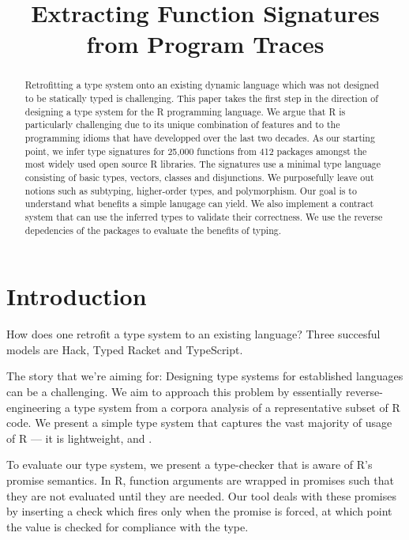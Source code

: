 \documentclass[acmsmall,review,anonymous]{acmart}\settopmatter{printfolios=true,printccs=false,printacmref=false}
\begin{document}
\title{Extracting Function Signatures from Program Traces}

\newcommand{\NUMFUNCTIONS}{25,000\xspace}  %
\newcommand{\NUMPACKAGES}{412\xspace}  %
\newcommand{\YEARS}{20\xspace} %


\begin{abstract}
  Retrofitting a type system onto an existing dynamic language which was not
  designed to be statically typed is challenging. This paper takes the first
  step in the direction of designing a type system for the R programming
  language. We argue that R is particularly challenging due to its unique
  combination of features and to the programming idioms that have developped
  over the last two decades. As our starting point, we infer type signatures
  for \NUMFUNCTIONS functions from \NUMPACKAGES packages amongst the most
  widely used open source R libraries. The signatures use a minimal type
  language consisting of basic types, vectors, classes and disjunctions. We
  purposefully leave out notions such as subtyping, higher-order types, and
  polymorphism. Our goal is to understand what benefits a simple lanugage
  can yield.  We also implement a contract system that can use the inferred
  types to validate their correctness. We use the reverse depedencies of the
  packages to evaluate the benefits of typing.
\end{abstract}
\maketitle


\section{Introduction}

How does one retrofit a type system to an existing language? Three succesful
models are Hack, Typed Racket and TypeScript. 


The story that we're aiming for: Designing type systems for established
languages can be a challenging.  We aim to approach this problem by
essentially reverse-engineering a type system from a corpora analysis of a
representative subset of R code.  We present a simple type system that
captures the vast majority of usage of R --- it is lightweight, and
.

To evaluate our type system, we present a type-checker that is aware of R's
promise semantics.  In R, function arguments are wrapped in promises such
that they are not evaluated until they are needed.  Our tool deals with
these promises by inserting a check which fires only when the promise is
forced, at which point the value is checked for compliance with the type.
\end{document}
